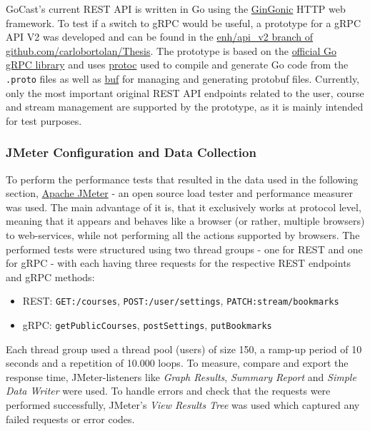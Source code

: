 GoCast's current REST API is written in Go using the \href{https://github.com/gin-gonic/gin}{GinGonic} HTTP web framework. To test if a switch to gRPC would be useful, a prototype for a gRPC \ac{API} V2 was developed and can be found in the \href{https://github.com/carlobortolan/Thesis/tree/enh/api\_v2}{enh/api\_v2 branch of github.com/carlobortolan/Thesis}.
The prototype is based on the \href{https://google.golang.org/grpc}{official Go gRPC library} and uses \href{https://github.com/protocolbuffers/protobuf}{protoc} used to compile and generate Go code from the \texttt{.proto} files as well as \href{https://github.com/bufbuild/buf}{buf} for managing and generating protobuf files. Currently, only the most important original REST \ac{API} endpoints related to the user, course and stream management are supported by the prototype, as it is mainly intended for test purposes.

\subsubsection{JMeter Configuration and Data Collection}

To perform the performance tests that resulted in the data used in the following section, \href{https://jmeter.apache.org/}{Apache JMeter} - an open source load tester and performance measurer was used. The main advantage of it is, that it exclusively works at protocol level, meaning that it appears and behaves like a browser (or rather, multiple browsers) to web-services, while not performing all the actions supported by browsers. The performed tests were structured using two thread groups - one for REST and one for gRPC - with each having three requests for the respective REST endpoints and gRPC methods:
\begin{itemize}
    \item REST: \texttt{GET:/courses}, \texttt{POST:/user/settings}, \texttt{PATCH:stream/bookmarks}
    \item gRPC: \texttt{getPublicCourses}, \texttt{postSettings}, \texttt{putBookmarks}
\end{itemize}
Each thread group used a thread pool (users) of size 150, a ramp-up period of 10 seconds and a repetition of 10.000 loops.
To measure, compare and export the response time, JMeter-listeners like \textit{Graph Results}, \textit{Summary Report} and \textit{Simple Data Writer} were used. To handle errors and check that the requests were performed successfully, JMeter’s \textit{View Results Tree} was used which captured any failed requests or error codes.

